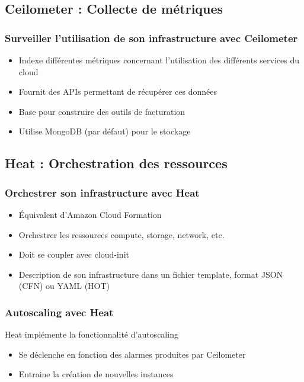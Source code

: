   \subsection[Ceilometer]{Ceilometer : Collecte de métriques}

  \begin{frame}
    \frametitle{Surveiller l'utilisation de son infrastructure avec Ceilometer}
    \begin{itemize}
      \item Indexe différentes métriques concernant l'utilisation des différents services du cloud
      \item Fournit des APIs permettant de récupérer ces données
      \item Base pour construire des outils de facturation
      \item Utilise MongoDB (par défaut) pour le stockage
    \end{itemize}
  \end{frame}

  \subsection[Heat]{Heat : Orchestration des ressources}

  \begin{frame}
    \frametitle{Orchestrer son infrastructure avec Heat}
    \begin{itemize}
      \item Équivalent d'Amazon Cloud Formation
      \item Orchestrer les ressources compute, storage, network, etc.
      \item Doit se coupler avec cloud-init\pause
      \item Description de son infrastructure dans un fichier template, format JSON (CFN) ou YAML (HOT)
    \end{itemize}
  \end{frame}

  \begin{frame}
    \frametitle{Autoscaling avec Heat}
    Heat implémente la fonctionnalité d'autoscaling
    \begin{itemize}
      \item Se déclenche en fonction des alarmes produites par Ceilometer
      \item Entraine la création de nouvelles instances
    \end{itemize}
  \end{frame}

